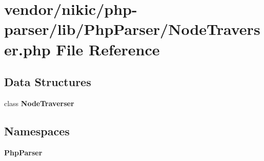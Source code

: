\section{vendor/nikic/php-\/parser/lib/\+Php\+Parser/\+Node\+Traverser.php File Reference}
\label{nikic_2php-parser_2lib_2_php_parser_2_node_traverser_8php}
\subsection*{Data Structures}
\begin{DoxyCompactItemize}
\item 
class {\bf Node\+Traverser}
\end{DoxyCompactItemize}
\subsection*{Namespaces}
\begin{DoxyCompactItemize}
\item 
 {\bf Php\+Parser}
\end{DoxyCompactItemize}
